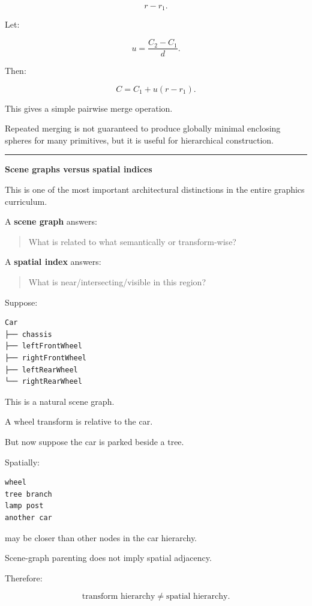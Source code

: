 \[
r-r_1.
\]

Let:

\[
u=
\frac{C_2-C_1}{d}.
\]

Then:

\[
\boxed{
C=C_1+u(r-r_1).
}
\]

This gives a simple pairwise merge operation.

Repeated merging is not guaranteed to produce globally minimal enclosing spheres for many primitives, but it is useful for hierarchical construction.

\begin{center}\rule{0.5\linewidth}{0.5pt}\end{center}

\textbf{Scene graphs versus spatial indices}

This is one of the most important architectural distinctions in the entire graphics curriculum.

A \textbf{scene graph} answers:

\begin{quote}
What is related to what semantically or transform-wise?
\end{quote}

A \textbf{spatial index} answers:

\begin{quote}
What is near/intersecting/visible in this region?
\end{quote}

Suppose:

\begin{verbatim}
Car
├── chassis
├── leftFrontWheel
├── rightFrontWheel
├── leftRearWheel
└── rightRearWheel
\end{verbatim}

This is a natural scene graph.

A wheel transform is relative to the car.

But now suppose the car is parked beside a tree.

Spatially:

\begin{verbatim}
wheel
tree branch
lamp post
another car
\end{verbatim}

may be closer than other nodes in the car hierarchy.

Scene-graph parenting does not imply spatial adjacency.

Therefore:

\[
\boxed{
\text{transform hierarchy}
\neq
\text{spatial hierarchy}.
}
\]

